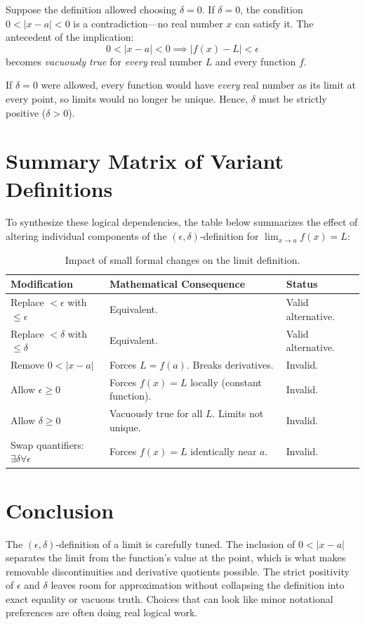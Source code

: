 \documentclass{essay}
\begin{document}
Suppose the definition allowed choosing \(\delta = 0\).
If \(\delta = 0\), the condition \(0 < |x - a| < 0\) is a contradiction—no real number \(x\) can satisfy it. The antecedent of the implication:
\[ 0 < |x - a| < 0 \implies |f(x) - L| < \epsilon \]
becomes \emph{vacuously true} for \emph{every} real number \(L\) and every function \(f\).

If \(\delta = 0\) were allowed, every function would have \emph{every} real number as its limit at every point, so limits would no longer be unique. Hence, \(\delta\) must be strictly positive (\(\delta > 0\)).

\section{Summary Matrix of Variant Definitions}

To synthesize these logical dependencies, the table below summarizes the effect of altering individual components of the \((\epsilon, \delta)\)-definition for \(\lim_{x \to a} f(x) = L\):

\begin{table}[h!]
  \centering
  \small
  \begin{tabular}{|l|l|l|}
    \hline
    \textbf{Modification} & \textbf{Mathematical Consequence} & \textbf{Status} \\ \hline
    Replace \(< \epsilon\) with \(\le \epsilon\) & Equivalent. & Valid alternative. \\ \hline
    Replace \(< \delta\) with \(\le \delta\) & Equivalent. & Valid alternative. \\ \hline
    Remove \(0 < |x - a|\) & Forces \(L = f(a)\). Breaks derivatives. & Invalid. \\ \hline
    Allow \(\epsilon \ge 0\) & Forces \(f(x) = L\) locally (constant function). & Invalid. \\ \hline
    Allow \(\delta \ge 0\) & Vacuously true for all \(L\). Limits not unique. & Invalid. \\ \hline
    Swap quantifiers: \(\exists \delta \forall \epsilon\) & Forces \(f(x) = L\) identically near \(a\). & Invalid. \\ \hline
  \end{tabular}
  \caption{Impact of small formal changes on the limit definition.}
\end{table}

\section{Conclusion}

The \((\epsilon, \delta)\)-definition of a limit is carefully tuned. The inclusion of \(0 < |x - a|\) separates the limit from the function's value at the point, which is what makes removable discontinuities and derivative quotients possible. The strict positivity of \(\epsilon\) and \(\delta\) leaves room for approximation without collapsing the definition into exact equality or vacuous truth. Choices that can look like minor notational preferences are often doing real logical work.
\end{document}
